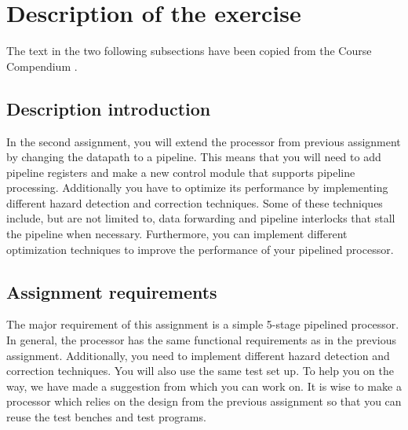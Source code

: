 \section{Description of the exercise}

The text in the two following subsections have been copied from the Course
Compendium \cite{compendium}.

\subsection{Description introduction}

In the second assignment, you will extend the processor from previous
assignment by changing the datapath to a pipeline. This means that you will need
to add pipeline registers and make a new control module that supports pipeline
processing. Additionally you have to optimize its performance by implementing
diﬀerent hazard detection and correction techniques. Some of these techniques
include, but are not limited to, data forwarding and pipeline interlocks that
stall the pipeline when necessary. Furthermore, you can implement different
optimization techniques to improve the performance of your pipelined processor.

\subsection{Assignment requirements}

The major requirement of this assignment is a simple 5-stage pipelined
processor. In general, the processor has the same functional requirements as in
the previous assignment. Additionally, you need to implement diﬀerent hazard
detection and correction techniques. You will also use the same test set up. To
help you on the way, we have made a suggestion from which you can work on. It is
wise to make a processor which relies on the design from the previous assignment
so that you can reuse the test benches and test programs.